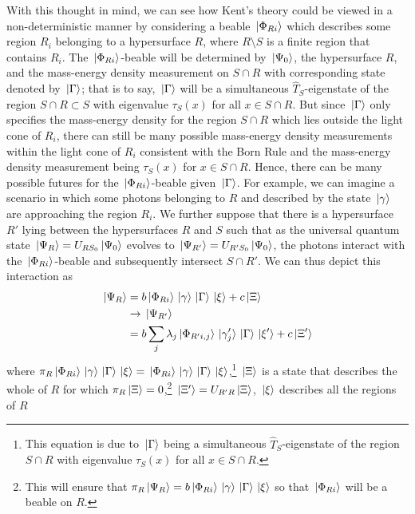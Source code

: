 With this thought in mind,  we can see how Kent's theory could be viewed in a non-deterministic manner by considering a beable $\ket*{\Phi_{Ri}}$ which describes some region $R_i$ belonging to a hypersurface $R$, where $R\setminus S$ is a finite region that contains $R_i$. The $\ket*{\Phi_{Ri}}$-beable will be determined by $\ket*{\Psi_0}$, the hypersurface $R$, and the mass-energy density measurement on $S\cap R$ with corresponding state denoted by $\ket*{\Gamma}$; that is to say, $\ket*{\Gamma}$  will be a simultaneous $\hat{T}_S$-eigenstate of the region $S\cap R\subset S$ with eigenvalue $\tau_S(x)$ for all $x\in S\cap R$. But since $\ket*{\Gamma}$ only specifies the mass-energy density for the region  $S\cap R$ which lies outside the light cone of $R_i$, there can still be many possible mass-energy density measurements within the light cone of $R_i$ consistent with the Born Rule and the mass-energy density measurement being $\tau_S(x)$ for $x\in S\cap R$. Hence, there can be many possible futures for the $\ket*{\Phi_{Ri}}$-beable given $\ket*{\Gamma}$. For example, we can imagine a scenario in which some photons belonging to $R$ and described by the state $\ket*{\gamma}$ are approaching the region $R_i$. We further suppose that there is a hypersurface $R'$ lying between the hypersurfaces $R$ and $S$ such that as the universal quantum state $\ket*{\Psi_{R}}=U_{RS_0}\ket*{\Psi_0}$ evolves to $\ket*{\Psi_{{R'}}}=U_{{R'}S_0}\ket*{\Psi_0}$, the photons interact with the $\ket*{\Phi_{Ri}}$-beable and subsequently intersect $S\cap {R'}$. We can thus depict this interaction as
\begin{equation}\label{psirtopsirprime}
\begin{split}
\ket*{\Psi_{R}}&= b\ket*{\Phi_{Ri}}\ket*{\gamma}\ket*{\Gamma}\ket*{\xi}+c\ket*{\Xi}\\
&\rightarrow \ket*{\Psi_{{R'}}}\\
&=b\sum_j \lambda_j \ket*{\Phi_{R'i, j}}\ket*{\gamma_{j}'}\ket*{\Gamma}\ket*{\xi'}+c\ket*{\Xi'}
\end{split}
\end{equation}
where $\pi_R\ket*{\Phi_{Ri}}\ket*{\gamma}\ket*{\Gamma}\ket*{\xi}=\ket*{\Phi_{Ri}}\ket*{\gamma}\ket*{\Gamma}\ket*{\xi}$,\footnote{This equation is due to  $\ket*{\Gamma}$ being a simultaneous $\hat{T}_S$-eigenstate of the region $S\cap R$ with eigenvalue $\tau_S(x)$ for all $x\in S\cap R$.}  $\ket*{\Xi}$ is a state that describes the whole of $R$ for which $\pi_R\ket*{\Xi}=0$,\footnote{This will ensure that $\pi_R\ket*{\Psi_{R}}=b\ket*{\Phi_{Ri}}\ket*{\gamma}\ket*{\Gamma}\ket*{\xi}$ so that
$\ket*{\Phi_{Ri}}$ will be a beable on $R$.}  $\ket*{\Xi'}=U_{R'R}\ket*{\Xi}$,  $\ket*{\xi}$ describes all the regions of $R$ 
